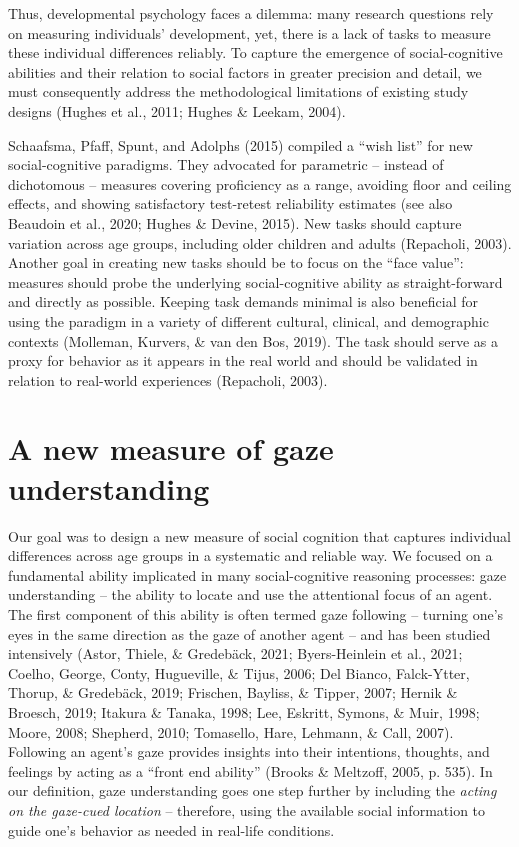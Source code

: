 \documentclass[
  man,floatsintext]{apa6}
\begin{document}
Thus, developmental psychology faces a dilemma: many research questions rely on measuring individuals' development, yet, there is a lack of tasks to measure these individual differences reliably.
To capture the emergence of social-cognitive abilities and their relation to social factors in greater precision and detail, we must consequently address the methodological limitations of existing study designs (Hughes et al., 2011; Hughes \& Leekam, 2004).

Schaafsma, Pfaff, Spunt, and Adolphs (2015) compiled a ``wish list'' for new social-cognitive paradigms.
They advocated for parametric -- instead of dichotomous -- measures covering proficiency as a range, avoiding floor and ceiling effects, and showing satisfactory test-retest reliability estimates (see also Beaudoin et al., 2020; Hughes \& Devine, 2015).
New tasks should capture variation across age groups, including older children and adults (Repacholi, 2003).
Another goal in creating new tasks should be to focus on the ``face value'': measures should probe the underlying social-cognitive ability as straight-forward and directly as possible.
Keeping task demands minimal is also beneficial for using the paradigm in a variety of different cultural, clinical, and demographic contexts (Molleman, Kurvers, \& van den Bos, 2019).
The task should serve as a proxy for behavior as it appears in the real world and should be validated in relation to real-world experiences (Repacholi, 2003).

\hypertarget{a-new-measure-of-gaze-understanding}{%
\section{A new measure of gaze understanding}\label{a-new-measure-of-gaze-understanding}}

Our goal was to design a new measure of social cognition that captures individual differences across age groups in a systematic and reliable way.
We focused on a fundamental ability implicated in many social-cognitive reasoning processes: gaze understanding -- the ability to locate and use the attentional focus of an agent.
The first component of this ability is often termed gaze following -- turning one's eyes in the same direction as the gaze of another agent -- and has been studied intensively (Astor, Thiele, \& Gredebäck, 2021; Byers-Heinlein et al., 2021; Coelho, George, Conty, Hugueville, \& Tijus, 2006; Del Bianco, Falck-Ytter, Thorup, \& Gredebäck, 2019; Frischen, Bayliss, \& Tipper, 2007; Hernik \& Broesch, 2019; Itakura \& Tanaka, 1998; Lee, Eskritt, Symons, \& Muir, 1998; Moore, 2008; Shepherd, 2010; Tomasello, Hare, Lehmann, \& Call, 2007).
Following an agent's gaze provides insights into their intentions, thoughts, and feelings by acting as a ``front end ability'' (Brooks \& Meltzoff, 2005, p. 535).
In our definition, gaze understanding goes one step further by including the \emph{acting on the gaze-cued location} -- therefore, using the available social information to guide one's behavior as needed in real-life conditions.
\end{document}
